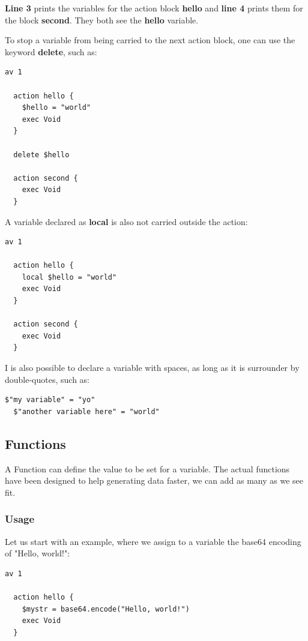 \documentclass[10pt]{article}
\begin{document}
\textbf{Line 3} prints the variables for the action block \textbf{hello} and \textbf{line 4}  prints them for the block \textbf{second}. They both see the \textbf{hello} variable.

To stop a variable from being carried to the next action block, one can use the keyword \textbf{delete}, such as:
\begin{lstlisting}[caption={Deleting our variable},captionpos=b]
  av 1

  action hello {
    $hello = "world"
    exec Void
  }

  delete $hello
  
  action second {
    exec Void
  }
\end{lstlisting}

A variable declared as \textbf{local} is also not carried outside the action:
\begin{lstlisting}[caption={Local variable},captionpos=b]
  av 1

  action hello {
    local $hello = "world"
    exec Void
  }
  
  action second {
    exec Void
  }
\end{lstlisting}

I is also possible to declare a variable with spaces, as long as it is surrounder by double-quotes, such as:
\begin{lstlisting}[caption={Variables with space},captionpos=b]
  $"my variable" = "yo"
  $"another variable here" = "world"
\end{lstlisting}

\subsection{Functions}

A Function can define the value to be set for a variable. The actual functions have been designed to help generating data faster, we can add as many as we see fit.

\subsubsection{Usage}
Let us start with an example, where we assign to a variable the base64 encoding of "Hello, world!":
\begin{lstlisting}[caption={Encoding a string},captionpos=b]
  av 1

  action hello {
    $mystr = base64.encode("Hello, world!")
    exec Void
  }
\end{lstlisting}
\end{document}
